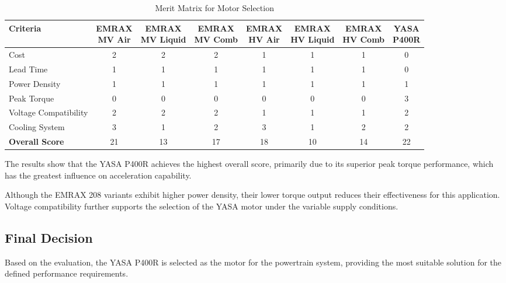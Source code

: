 \documentclass[11pt, a4paper]{report}
\numberwithin{equation}{section}
\begin{document}
\begin{table}[H]
\centering
\small
\renewcommand{\arraystretch}{1.5}
\setlength{\tabcolsep}{4pt}

\caption{Merit Matrix for Motor Selection}
\label{tab:motor_selection}

\begin{tabular}{lccccccc}
\toprule
\textbf{Criteria} 
& \shortstack{EMRAX \\ MV Air} 
& \shortstack{EMRAX \\ MV Liquid} 
& \shortstack{EMRAX \\ MV Comb} 
& \shortstack{EMRAX \\ HV Air} 
& \shortstack{EMRAX \\ HV Liquid} 
& \shortstack{EMRAX \\ HV Comb} 
& \shortstack{YASA \\ P400R} \\
\midrule
Cost & 2 & 2 & 2 & 1 & 1 & 1 & 0 \\
Lead Time & 1 & 1 & 1 & 1 & 1 & 1 & 0 \\
Power Density & 1 & 1 & 1 & 1 & 1 & 1 & 1 \\
Peak Torque & 0 & 0 & 0 & 0 & 0 & 0 & 3 \\
Voltage Compatibility & 2 & 2 & 2 & 1 & 1 & 1 & 2 \\
Cooling System & 3 & 1 & 2 & 3 & 1 & 2 & 2 \\
\midrule
\textbf{Overall Score} & 21 & 13 & 17 & 18 & 10 & 14 & 22 \\
\bottomrule
\end{tabular}
\end{table}

The results show that the YASA P400R achieves the highest overall score, primarily due to its superior peak torque performance, which has the greatest influence on acceleration capability.

Although the EMRAX 208 variants exhibit higher power density, their lower torque output reduces their effectiveness for this application. Voltage compatibility further supports the selection of the YASA motor under the variable supply conditions.

\subsection{Final Decision}

Based on the evaluation, the YASA P400R is selected as the motor for the powertrain system, providing the most suitable solution for the defined performance requirements.
\end{document}
